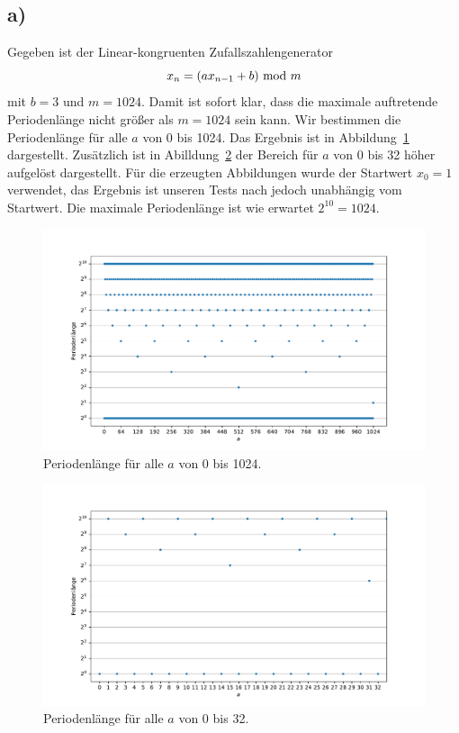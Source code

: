\documentclass[a4paper, 11pt]{article}
\begin{document}
\subsection*{a)}
Gegeben ist der Linear-kongruenten Zufallszahlengenerator
\begin{equation}
    x_n = (ax_{n-1} + b)\ \textup{mod}\ m
    \label{eqn:linkon}
\end{equation}
mit $b = 3$ und $m = 1024$. Damit ist sofort klar, dass die maximale auftretende Periodenlänge nicht größer als $m = 1024$ sein kann. Wir bestimmen die Periodenlänge für alle $a$ von 0 bis 1024. Das Ergebnis ist in Abbildung~\ref{fig:9a_full} dargestellt. Zusätzlich ist in Abilldung~\ref{fig:9a_zoom} der Bereich für $a$ von 0 bis 32 höher aufgelöst dargestellt. Für die erzeugten Abbildungen wurde der Startwert $x_0 = 1$ verwendet, das Ergebnis ist unseren Tests nach jedoch unabhängig vom Startwert. Die maximale Periodenlänge ist wie erwartet $2^{10} = 1024$.
\begin{figure}
    \centering
    \includegraphics[width=\textwidth]{../A09/A9a_full.pdf}
    \caption{Periodenlänge für alle $a$ von 0 bis 1024.}
    \label{fig:9a_full}
\end{figure}
\begin{figure}
    \centering
    \includegraphics[width=\textwidth]{../A09/A9a_zoom.pdf}
    \caption{Periodenlänge für alle $a$ von 0 bis 32.}
    \label{fig:9a_zoom}
\end{figure}
\end{document}
